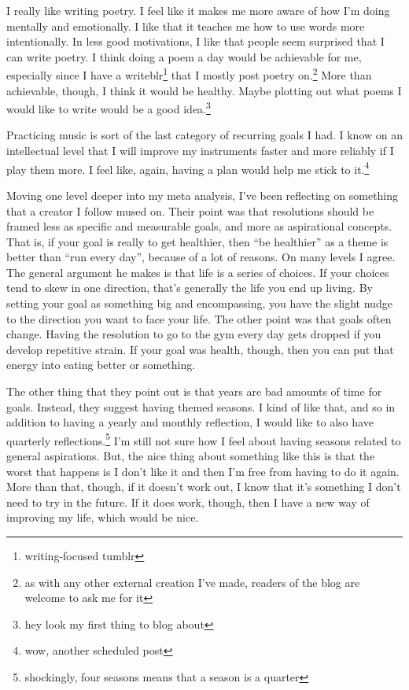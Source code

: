 \documentclass[12pt]{article}[titlepage]
\newcommand{\say}[1]{``#1''}
\newcommand{\1}{\={a}}
\newcommand{\2}{\={e}}
\newcommand{\3}{\={\i}}
\newcommand{\4}{\=o}
\newcommand{\5}{\=u}
\newcommand{\6}{\={A}}
\renewcommand{\,}{\textsuperscript{,}}
\begin{document}
I really like writing poetry.
I feel like it makes me more aware of how I'm doing mentally and emotionally.
I like that it teaches me how to use words more intentionally.
In less good motivations, I like that people seem surprised that I can write poetry.
I think doing a poem a day would be achievable for me, especially since I have a writeblr\footnote{writing-focused tumblr} that I mostly post poetry on.\footnote{as with any other external creation I've made, readers of the blog are welcome to ask me for it}
More than achievable, though, I think it would be healthy.
Maybe plotting out what poems I would like to write would be a good idea.\footnote{hey look my first thing to blog about}

Practicing music is sort of the last category of recurring goals I had.
I know on an intellectual level that I will improve my instruments faster and more reliably if I play them more.
I feel like, again, having a plan would help me stick to it.\footnote{wow, another scheduled post}

Moving one level deeper into my meta analysis, I've been reflecting on something that a creator I follow mused on.
Their point was that resolutions should be framed less as specific and measurable goals, and more as aspirational concepts.
That is, if your goal is really to get healthier, then \say{be healthier} as a theme is better than \say{run every day}, because of a lot of reasons.
On many levels I agree.
The general argument he makes is that life is a series of choices.
If your choices tend to skew in one direction, that's generally the life you end up living.
By setting your goal as something big and encompassing, you have the slight nudge to the direction you want to face your life.
The other point was that goals often change.
Having the resolution to go to the gym every day gets dropped if you develop repetitive strain.
If your goal was health, though, then you can put that energy into eating better or something.

The other thing that they point out is that years are bad amounts of time for goals.
Instead, they suggest having themed seasons.
I kind of like that, and so in addition to having a yearly and monthly reflection, I would like to also have quarterly reflections.\footnote{shockingly, four seasons means that a season is a quarter}
I'm still not sure how I feel about having seasons related to general aspirations.
But, the nice thing about something like this is that the worst that happens is I don't like it and then I'm free from having to do it again.
More than that, though, if it doesn't work out, I know that it's something I don't need to try in the future.
If it does work, though, then I have a new way of improving my life, which would be nice.
\end{document}
